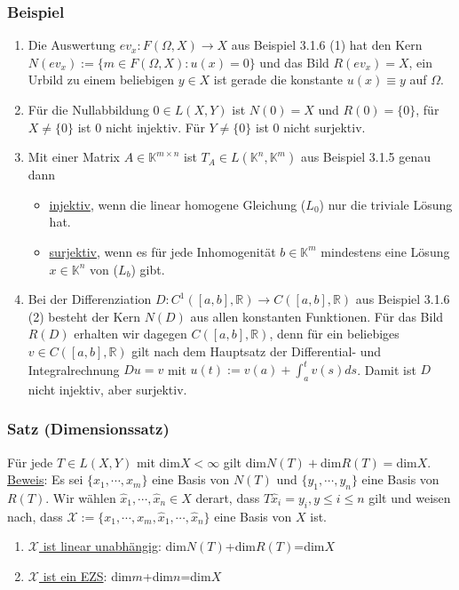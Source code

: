 \subsubsection{Beispiel}
\renewcommand{\labelenumi}{(\arabic{enumi})}
\begin{enumerate}
\item Die Auswertung $ev_x:F(\Omega ,X)\rightarrow X$ aus Beispiel 3.1.6 (1) hat den Kern $N(ev_x):=\{m\in F(\Omega ,X):u(x)=0\}$ und das Bild $R(ev_x)=X$, ein Urbild zu einem beliebigen $y\in X$ ist gerade die konstante $u(x)\equiv y$ auf $\Omega$.
\item Für die Nullabbildung $0\in L(X,Y)$ ist $N(0)=X$ und $R(0)=\{0\}$, für $X\not= \{0\}$ ist $0$ nicht injektiv.  Für $Y\not= \{0\}$ ist $0$ nicht surjektiv.
\item Mit einer Matrix $A\in \mathbb{K}^{m\times n}$ ist $T_A\in L(\mathbb{K}^n,\mathbb{K}^m)$ aus Beispiel 3.1.5 genau dann
\begin{itemize}
\item \underline{injektiv}, wenn die linear homogene Gleichung ($L_0$) nur die triviale Lösung hat.
\item \underline{surjektiv}, wenn es für jede Inhomogenität $b\in\mathbb{K}^m$ mindestens eine Lösung $x\in\mathbb{K}^n$ von ($L_b$) gibt.
\end{itemize}
\item Bei der Differenziation $D:C^1([a,b],\mathbb{R})\rightarrow C([a,b],\mathbb{R})$ aus Beispiel 3.1.6 (2) besteht der Kern $N(D)$ aus allen konstanten Funktionen.  Für das Bild $R(D)$ erhalten wir dagegen $C([a,b],\mathbb{R})$, denn für ein beliebiges $v\in C([a,b],\mathbb{R})$ gilt nach dem Hauptsatz der Differential- und Integralrechnung $Du=v$ mit $u(t):=v(a)+\int_a^t v(s)ds$.  Damit ist $D$ nicht injektiv, aber surjektiv.
\end{enumerate}
\subsubsection{Satz (Dimensionssatz)}
Für jede $T\in L(X,Y)$ mit dim$X<\infty$ gilt dim$N(T)+$dim$R(T)=$dim$X$.\\
\underline{Beweis}: Es sei $\{x_1,\cdots ,x_m\}$ eine Basis von $N(T)$ und $\{y_1,\cdots ,y_n\}$ eine Basis von $R(T)$.  Wir wählen $\hat{x}_1,\cdots ,\hat{x}_n \in X$ derart, dass $T\hat{x}_i=y_i,y\leq i\leq n$ gilt und weisen nach, dass $\mathcal{X}:=\{x_1,\cdots ,x_m,\hat{x}_1,\cdots ,\hat{x}_n\}$ eine Basis von $X$ ist.
\renewcommand{\labelenumi}{(\roman{enumi})}
\begin{enumerate}
\item \underline{$\mathcal{X}$ ist linear unabhängig}: dim$N(T)$+dim$R(T)$=dim$X$
\item \underline{$\mathcal{X}$ ist ein EZS}: dim$m$+dim$n$=dim$X$
\end{enumerate}
